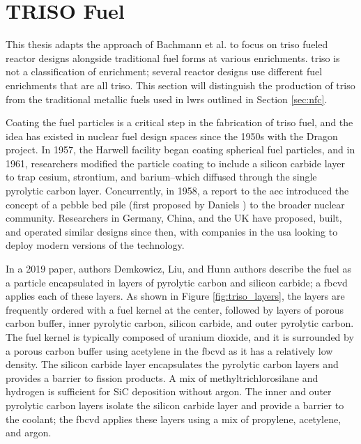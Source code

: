 \section{TRISO Fuel}
\label{sec:triso_fuel}

This thesis adapts the approach of Bachmann et al.
\cite{bachmann_enrichment_2021} to focus on \gls{triso} fueled reactor designs
alongside traditional fuel forms at various enrichments. \gls{triso} is not a
classification of enrichment; several reactor designs use different fuel
enrichments that are all \gls{triso}. This section will distinguish the
production of \gls{triso} from the traditional metallic fuels used in
\glspl{lwr} outlined in Section \ref{sec:nfc}.

Coating the fuel particles is a critical step in the fabrication of \gls{triso}
fuel, and the idea has existed in nuclear fuel design spaces since the 1950s
\cite{price_dragon_2012} with the Dragon project. In 1957, the Harwell facility
began coating spherical fuel particles, and in 1961, researchers modified the
particle coating to include a silicon carbide layer to trap cesium, strontium,
and barium--which diffused through the single pyrolytic carbon layer.
Concurrently, in 1958, a report to the \gls{aec} introduced the concept of a
pebble bed pile (first proposed by Daniels
\cite{f_b_daniels_suggestions_1944}) to the broader nuclear community.
Researchers in Germany, China, and the UK have proposed, built, and operated
similar designs since then, with companies in the \gls{usa} looking to deploy
modern versions of the technology.

In a 2019 paper, authors Demkowicz, Liu, and Hunn \cite{particle_review_2019}
authors describe the fuel as a particle encapsulated in layers of pyrolytic
carbon and silicon carbide; a \gls{fbcvd} applies each of these layers. As
shown in Figure \ref{fig:triso_layers}, the layers are frequently ordered with
a fuel kernel at the center, followed by layers of porous carbon buffer, inner
pyrolytic carbon, silicon carbide, and outer pyrolytic carbon. The fuel kernel
is typically composed of uranium dioxide, and it is surrounded by a porous
carbon buffer using acetylene in the \gls{fbcvd} as it has a relatively low
density. The silicon carbide layer encapsulates the pyrolytic carbon layers and
provides a barrier to fission products. A mix of methyltrichlorosilane and
hydrogen is sufficient for SiC deposition without argon. The inner and outer
pyrolytic carbon layers isolate the silicon carbide layer and provide a barrier
to the coolant; the \gls{fbcvd} applies these layers using a mix of propylene,
acetylene, and argon.

